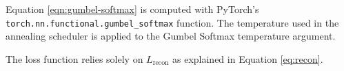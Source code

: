 Equation \ref{eqn:gumbel-softmax} is computed with PyTorch's \lstinline[language=Python]|torch.nn.functional.gumbel_softmax| function.
The temperature used in the annealing scheduler is applied to the Gumbel Softmax temperature argument.

The loss function relies solely on $L_\text{recon}$ as explained in Equation \ref{eq:recon}.










